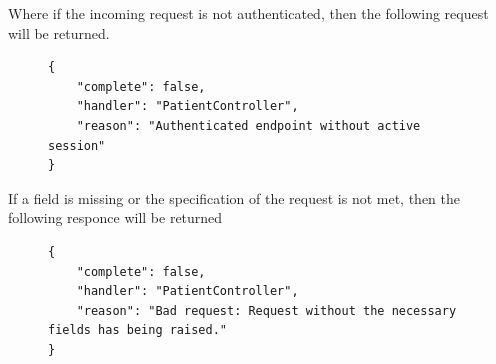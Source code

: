 					Where if the incoming request is not authenticated, then the following request will be returned.
					\begin{figure}[H]
						\iftrue
						\begin{lstlisting}[]
{
	"complete": false,
	"handler": "PatientController",
	"reason": "Authenticated endpoint without active session"
}
						\end{lstlisting}
					\end{figure}
					If a field is missing or the specification of the request is not met, then the following responce will be returned
					\begin{figure}[H]
						\iftrue
						\begin{lstlisting}[]
{
	"complete": false,
	"handler": "PatientController",
	"reason": "Bad request: Request without the necessary fields has being raised."
}					
						\end{lstlisting}
					\end{figure}
